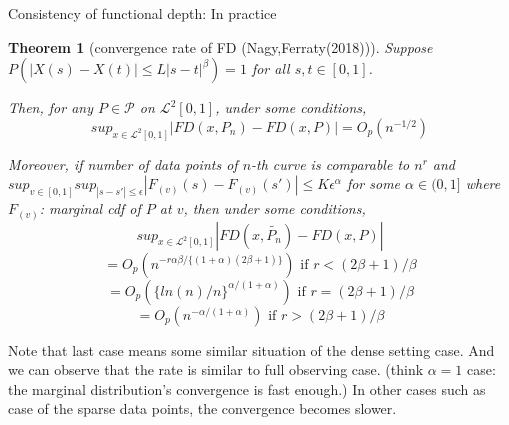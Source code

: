 \documentclass[aspectratio=169,ignorenonframetext,9pt]{beamer}
\theoremstyle{plain}
\newtheorem{thm}{Theorem}[section]
\theoremstyle{definition}
\begin{document}
\begin{frame}{Consistency of functional depth: In practice}
\begin{thm}[convergence rate of FD (Nagy,Ferraty(2018))]
    Suppose $P(|X(s)-X(t)|\leq L|s-t|^\beta)=1$ for all $s,t \in [0,1]$.

    Then, for any $P\in\mathcal{P}$ on $\mathcal{L}^2[0,1]$, under some conditions,
    \[sup_{x\in\mathcal{L}^2[0,1]}|FD(x,P_n)-FD(x,P)|=O_p(n^{-1/2})\]
    
    Moreover, if number of data points of $n$-th curve is comparable to $n^r$ and 
    \(sup_{v\in[0,1]} sup_{|s-s'|\leq \epsilon} |F_{(v)}(s)-F_{(v)}(s')|\leq K\epsilon^\alpha\) for some $\alpha\in(0,1]$
    where $F_{(v)}$: marginal cdf of $P$ at $v$,
    then under some conditions,
    \[sup_{x\in\mathcal{L}^2[0,1]}|FD(x,\tilde{P_n})-FD(x,P)|\]
    \[=O_p(n^{-r\alpha\beta/\{(1+\alpha)(2\beta+1)\}}) \text{ if } r<(2\beta+1)/\beta\]
    \[=O_p(\{ln(n)/n\}^{\alpha/(1+\alpha)}) \text{ if } r=(2\beta+1)/\beta\]
    \[=O_p(n^{-\alpha/(1+\alpha)}) \text{ if } r>(2\beta+1)/\beta\]
\end{thm}
Note that last case means some similar situation of the dense setting case. 
And we can observe that the rate is similar to full observing case.
(think $\alpha=1$ case: the marginal distribution's convergence is fast enough.)
In other cases such as case of the sparse data points, the convergence becomes slower.

\end{frame}
\end{document}
